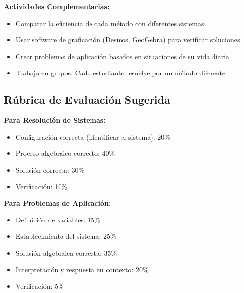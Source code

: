 \textbf{Actividades Complementarias:}

\begin{itemize}
    \item Comparar la eficiencia de cada método con diferentes sistemas
    \item Usar software de graficación (Desmos, GeoGebra) para verificar soluciones
    \item Crear problemas de aplicación basados en situaciones de su vida diaria
    \item Trabajo en grupos: Cada estudiante resuelve por un método diferente
\end{itemize}

\subsection*{Rúbrica de Evaluación Sugerida}

\textbf{Para Resolución de Sistemas:}

\begin{itemize}
    \item Configuración correcta (identificar el sistema): 20\%
    \item Proceso algebraico correcto: 40\%
    \item Solución correcta: 30\%
    \item Verificación: 10\%
\end{itemize}

\textbf{Para Problemas de Aplicación:}

\begin{itemize}
    \item Definición de variables: 15\%
    \item Establecimiento del sistema: 25\%
    \item Solución algebraica correcta: 35\%
    \item Interpretación y respuesta en contexto: 20\%
    \item Verificación: 5\%
\end{itemize}
